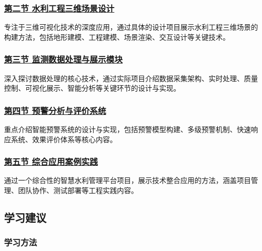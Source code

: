 \subsubsection{\texorpdfstring{\href{section08-02.md}{第二节
水利工程三维场景设计}}{第二节 水利工程三维场景设计}}\label{ux7b2cux4e8cux8282-ux6c34ux5229ux5de5ux7a0bux4e09ux7ef4ux573aux666fux8bbeux8ba1}

专注于三维可视化技术的深度应用，通过具体的设计项目展示水利工程三维场景的构建方法，包括地形建模、工程建模、场景渲染、交互设计等关键技术。

\subsubsection{\texorpdfstring{\href{section08-03.md}{第三节
监测数据处理与展示模块}}{第三节 监测数据处理与展示模块}}\label{ux7b2cux4e09ux8282-ux76d1ux6d4bux6570ux636eux5904ux7406ux4e0eux5c55ux793aux6a21ux5757}

深入探讨数据处理的核心技术，通过实际项目介绍数据采集架构、实时处理、质量控制、可视化展示、智能分析等关键环节的设计与实现。

\subsubsection{\texorpdfstring{\href{section08-04.md}{第四节
预警分析与评价系统}}{第四节 预警分析与评价系统}}\label{ux7b2cux56dbux8282-ux9884ux8b66ux5206ux6790ux4e0eux8bc4ux4ef7ux7cfbux7edf}

重点介绍智能预警系统的设计与实现，包括预警模型构建、多级预警机制、快速响应系统、效果评价体系等核心内容。

\subsubsection{\texorpdfstring{\href{section08-05.md}{第五节
综合应用案例实践}}{第五节 综合应用案例实践}}\label{ux7b2cux4e94ux8282-ux7efcux5408ux5e94ux7528ux6848ux4f8bux5b9eux8df5}

通过一个综合性的智慧水利管理平台项目，展示技术整合应用的方法，涵盖项目管理、团队协作、测试部署等工程实践内容。

\subsection{学习建议}\label{ux5b66ux4e60ux5efaux8bae}

\subsubsection{学习方法}\label{ux5b66ux4e60ux65b9ux6cd5}

